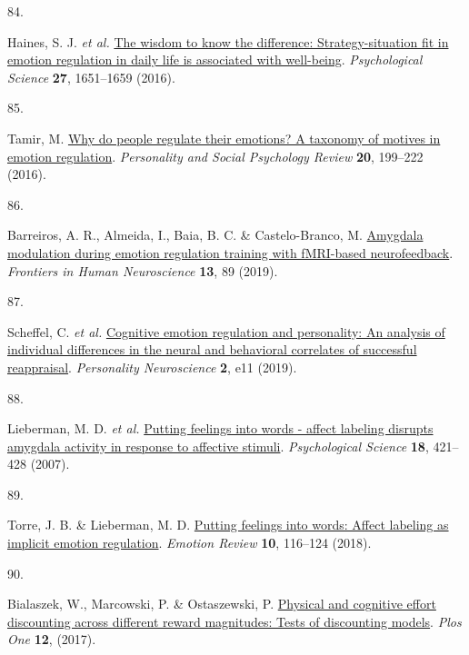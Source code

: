 \documentclass[
  man,floatsintext]{apa6}
\newlength{\cslhangindent}
\newlength{\csllabelwidth}
\newlength{\cslentryspacingunit} %
\newenvironment{CSLReferences}[2] %
 {%
  \setlength{\parindent}{0pt}
  \ifodd #1
  \let\oldpar\par
  \def\par{\hangindent=\cslhangindent\oldpar}
  \fi
  \setlength{\parskip}{#2\cslentryspacingunit}
 }%
 {}
\newcommand{\CSLLeftMargin}[1]{\parbox[t]{\csllabelwidth}{#1}}
\newcommand{\CSLRightInline}[1]{\parbox[t]{\linewidth - \csllabelwidth}{#1}\break}
\begin{document}
\begin{CSLReferences}{0}{0}
\leavevmode{}%
\CSLLeftMargin{84. }%
\CSLRightInline{Haines, S. J. \emph{et al.} \href{https://doi.org/10.1177/0956797616669086}{The wisdom to know the difference: Strategy-situation fit in emotion regulation in daily life is associated with well-being}. \emph{Psychological Science} \textbf{27}, 1651--1659 (2016).}

\leavevmode{}%
\CSLLeftMargin{85. }%
\CSLRightInline{Tamir, M. \href{https://doi.org/10.1177/1088868315586325}{Why do people regulate their emotions? A taxonomy of motives in emotion regulation}. \emph{Personality and Social Psychology Review} \textbf{20}, 199--222 (2016).}

\leavevmode{}%
\CSLLeftMargin{86. }%
\CSLRightInline{Barreiros, A. R., Almeida, I., Baia, B. C. \& Castelo-Branco, M. \href{https://doi.org/10.3389/fnhum.2019.00089}{Amygdala modulation during emotion regulation training with fMRI-based neurofeedback}. \emph{Frontiers in Human Neuroscience} \textbf{13}, 89 (2019).}

\leavevmode{}%
\CSLLeftMargin{87. }%
\CSLRightInline{Scheffel, C. \emph{et al.} \href{https://doi.org/10.1017/pen.2019.11}{Cognitive emotion regulation and personality: An analysis of individual differences in the neural and behavioral correlates of successful reappraisal}. \emph{Personality Neuroscience} \textbf{2}, e11 (2019).}

\leavevmode{}%
\CSLLeftMargin{88. }%
\CSLRightInline{Lieberman, M. D. \emph{et al.} \href{https://doi.org/10.1111/j.1467-9280.2007.01916.x}{Putting feelings into words - affect labeling disrupts amygdala activity in response to affective stimuli}. \emph{Psychological Science} \textbf{18}, 421--428 (2007).}

\leavevmode{}%
\CSLLeftMargin{89. }%
\CSLRightInline{Torre, J. B. \& Lieberman, M. D. \href{https://doi.org/10.1177/1754073917742706}{Putting feelings into words: Affect labeling as implicit emotion regulation}. \emph{Emotion Review} \textbf{10}, 116--124 (2018).}

\leavevmode{}%
\CSLLeftMargin{90. }%
\CSLRightInline{Bialaszek, W., Marcowski, P. \& Ostaszewski, P. \href{https://doi.org/ARTN\%20e0182353\%0A10.1371/journal.pone.0182353}{Physical and cognitive effort discounting across different reward magnitudes: Tests of discounting models}. \emph{Plos One} \textbf{12}, (2017).}

\end{CSLReferences}
\end{document}
